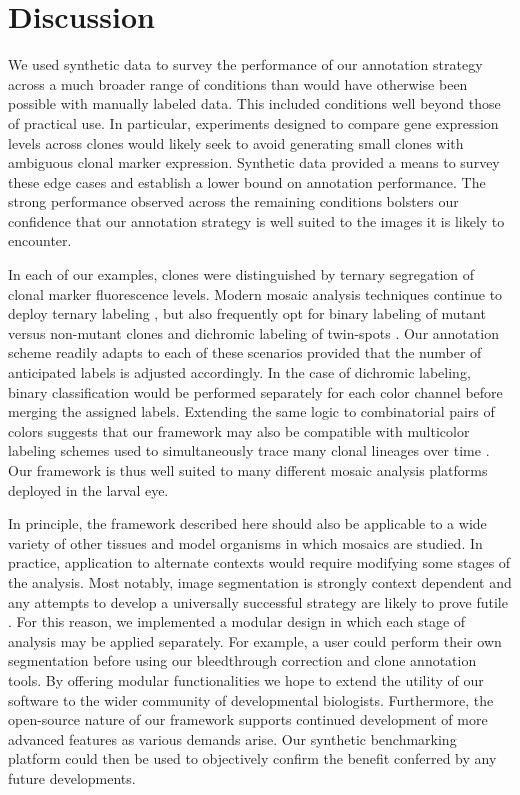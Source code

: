
\section{Discussion}

We used synthetic data to survey the performance of our annotation strategy across a much broader range of conditions than would have otherwise been possible with manually labeled data. This included conditions well beyond those of practical use. In particular, experiments designed to compare gene expression levels across clones would likely seek to avoid generating small clones with ambiguous clonal marker expression. Synthetic data provided a means to survey these edge cases and establish a lower bound on annotation performance. The strong performance observed across the remaining conditions bolsters our confidence that our annotation strategy is well suited to the images it is likely to encounter.

In each of our examples, clones were distinguished by ternary segregation of clonal marker fluorescence levels. Modern mosaic analysis techniques continue to deploy ternary labeling \cite{Gambis2011,Dourlen2013}, but also frequently opt for binary labeling of mutant versus non-mutant clones \cite{Fisher2017,Wu2007,Zhou2016} and dichromic labeling of twin-spots \cite{Heffern2009,Yu2010}. Our annotation scheme readily adapts to each of these scenarios provided that the number of anticipated labels is adjusted accordingly. In the case of dichromic labeling, binary classification would be performed separately for each color channel before merging the assigned labels. Extending the same logic to combinatorial pairs of colors suggests that our framework may also be compatible with multicolor labeling schemes used to simultaneously trace many clonal lineages over time \cite{Denes2013,Hadjieconomou2011,Hampel2011}. Our framework is thus well suited to many different mosaic analysis platforms deployed in the larval eye.

In principle, the framework described here should also be applicable to a wide variety of other tissues \cite{Neufeld1998,Tworoger1999} and model organisms \cite{Collins2010,Munoz-Jimenez2017,Wang2007} in which mosaics are studied. In practice, application to alternate contexts would require modifying some stages of the analysis. Most notably, image segmentation is strongly context dependent and any attempts to develop a universally successful strategy are likely to prove futile \cite{Meijering2012}. For this reason, we implemented a modular design in which each stage of analysis may be applied separately. For example, a user could perform their own segmentation before using our bleedthrough correction and clone annotation tools. By offering modular functionalities we hope to extend the utility of our software to the wider community of developmental biologists. Furthermore, the open-source nature of our framework supports continued development of more advanced features as various demands arise. Our synthetic benchmarking platform could then be used to objectively confirm the benefit conferred by any future developments.



